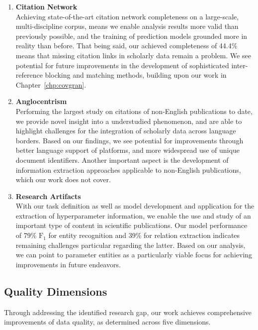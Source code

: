 \begin{enumerate}
\item \textbf{Citation Network}\\
Achieving state-of-the-art citation network completeness on a large-scale, multi-discipline corpus,
means we enable analysis results more valid than previously possible, and the training of prediction models grounded more in reality than before.
That being said, our achieved completeness of 44.4\% means that missing citation links in scholarly data remain a problem.
We see potential for future improvements in the development of sophisticated inter-reference blocking and matching methods, building upon our work in Chapter~\ref{chp:covgran}.
%
\item \textbf{Anglocentrism}\\
Performing the largest study on citations of non-English publications to date,
we provide novel insight into a understudied phenomenon, and are able to highlight challenges for the integration of scholarly data across language borders.
Based on our findings, we see potential for improvements through better language support of platforms, and more widespread use of unique document identifiers. Another important aspect is the development of information extraction approaches applicable to non-English publications, which our work does not cover.
%
\item \textbf{Research Artifacts}\\
With our task definition as well as model development and application for the extraction of hyperparameter information,
we enable the use and study of an important type of content in scientific publications.
Our model performance of 79\% $\text{F}_1$ for entity recognition and 39\% for relation extraction indicates remaining challenges particular regarding the latter.
Based on our analysis, we can point to parameter entities as a particularly viable focus for achieving improvements in future endeavors.
\end{enumerate}

\subsection{Quality Dimensions}
Through addressing the identified research gap, our work achieves comprehensive improvements of data quality, as determined across five dimensions.

